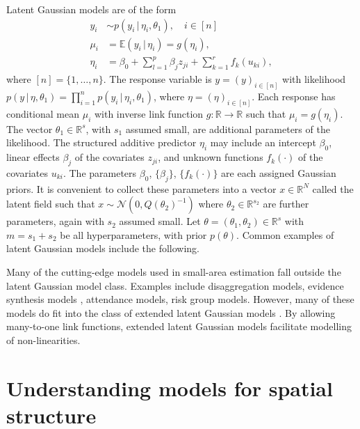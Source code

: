 \documentclass[a4paper, nobind]{templates/ociamthesis}
\begin{document}
Latent Gaussian models \autocite{rue2009approximate} are of the form
\begin{align*}
y_i &\sim p(y_i \, | \, \eta_i, \theta_1), \quad i \in [n]\\
\mu_i &= \mathbb{E}(y_i \, | \, \eta_i) = g(\eta_i), \\
\eta_i &= \beta_0 + \sum_{l = 1}^{p} \beta_j z_{ji} + \sum_{k = 1}^{r} f_k(u_{ki}),
\end{align*}
where \([n] = \{1, \ldots, n\}\).
The response variable is \(y = (y)_{i \in [n]}\) with likelihood \(p(y \, | \, \eta, \theta_1) = \prod_{i = 1}^n p(y_i \, | \, \eta_i, \theta_1)\), where \(\eta = (\eta)_{i \in [n]}\).
Each response has conditional mean \(\mu_i\) with inverse link function \(g: \mathbb{R} \to \mathbb{R}\) such that \(\mu_i = g(\eta_i)\).
The vector \(\theta_1 \in \mathbb{R}^s\), with \(s_1\) assumed small, are additional parameters of the likelihood.
The structured additive predictor \(\eta_i\) may include an intercept \(\beta_0\), linear effects \(\beta_j\) of the covariates \(z_{ji}\), and unknown functions \(f_k(\cdot)\) of the covariates \(u_{ki}\).
The parameters \(\beta_0\), \(\{\beta_j\}\), \(\{f_k(\cdot)\}\) are each assigned Gaussian priors.
It is convenient to collect these parameters into a vector \(x \in \mathbb{R}^N\) called the latent field such that \(x \sim \mathcal{N}(0, Q(\theta_2)^{-1})\) where \(\theta_2 \in \mathbb{R}^{s_2}\) are further parameters, again with \(s_2\) assumed small.
Let \(\theta = (\theta_1, \theta_2) \in \mathbb{R}^s\) with \(m = s_1 + s_2\) be all hyperparameters, with prior \(p(\theta)\).
Common examples of latent Gaussian models include the following.

Many of the cutting-edge models used in small-area estimation fall outside the latent Gaussian model class.
Examples include disaggregation models, evidence synthesis models \autocite{eaton2019joint,eaton2021naomi}, attendance models, risk group models.
However, many of these models do fit into the class of extended latent Gaussian models \autocite{stringer2021fast}.
By allowing many-to-one link functions, extended latent Gaussian models facilitate modelling of non-linearities.

\hypertarget{understanding-models-for-spatial-structure}{%
\chapter{Understanding models for spatial structure}\label{understanding-models-for-spatial-structure}}
\end{document}

